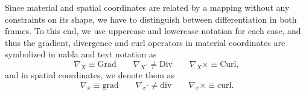 \documentclass{article}
\newcommand{\vX}{\nabla_X}
\newcommand{\vx}{\nabla_x}
\begin{document}
Since material and spatial coordinates are related by a mapping without any constraints on its shape, we have to distinguish between differentiation in both frames. To this end, we use uppercase and lowercase notation for each case, and thus the gradient, divergence and curl operators in material coordinates are symbolized in nabla and text notation as 
\begin{equation*}
    \vX \equiv \text{Grad} \qquad \vX\cdot \neq \text{Div} \qquad \vX \times \equiv \text{Curl},
\end{equation*}
and in spatial coordinates, we denote them as 
\begin{equation*}
    \vx \equiv \text{grad} \qquad \vx\cdot \neq \text{div} \qquad \vx \times \equiv \text{curl}.
\end{equation*}
\end{document}
